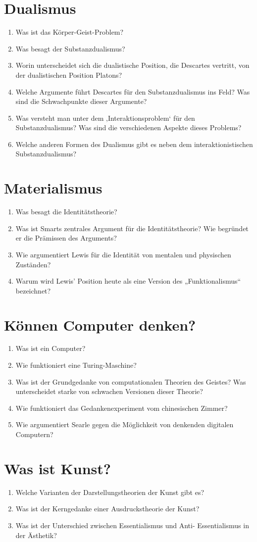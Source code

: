 \documentclass[../main.tex]{subfiles}
\begin{document}
\section{Dualismus} 
\begin{enumerate}
	\item Was ist das Körper-Geist-Problem?
	\item Was besagt der Substanzdualismus?
	\item Worin unterscheidet sich die dualistische Position, die Descartes vertritt, von der dualistischen Position Platons?
	\item Welche Argumente führt Descartes für den Substanzdualismus ins Feld? Was sind die Schwachpunkte dieser Argumente?
	\item Was versteht man unter dem ‚Interaktionsproblem‘ für den Substanzdualismus? Was sind die verschiedenen Aspekte dieses Problems?
	\item Welche anderen Formen des Dualismus gibt es neben dem interaktionistischen Substanzdualismus?
\end{enumerate}

\section{Materialismus} 
\begin{enumerate}
	\item Was besagt die Identitätstheorie?
	\item Was ist Smarts zentrales Argument für die Identitätstheorie? Wie begründet er die Prämissen des Arguments?
	\item Wie argumentiert Lewis für die Identität von mentalen und physischen Zuständen?
	\item Warum wird Lewis’ Position heute als eine Version des „Funktionalismus“ bezeichnet?
\end{enumerate}

\section{Können Computer denken?} 
\begin{enumerate}
	\item Was ist ein Computer?
	\item Wie funktioniert eine Turing-Maschine?
	\item Was ist der Grundgedanke von computationalen Theorien des Geistes? Was unterscheidet starke von schwachen Versionen dieser Theorie?
	\item Wie funktioniert das Gedankenexperiment vom chinesischen Zimmer?
	\item Wie argumentiert Searle gegen die Möglichkeit von denkenden digitalen Computern?
\end{enumerate}

\section{Was ist Kunst?} 
\begin{enumerate}
	\item Welche Varianten der Darstellungstheorien der Kunst gibt es?
	\item Was ist der Kerngedanke einer Ausdruckstheorie der Kunst?
	\item Was ist der Unterschied zwischen Essentialismus und Anti- Essentialismus in der Ästhetik?
\end{enumerate}
\end{document}

